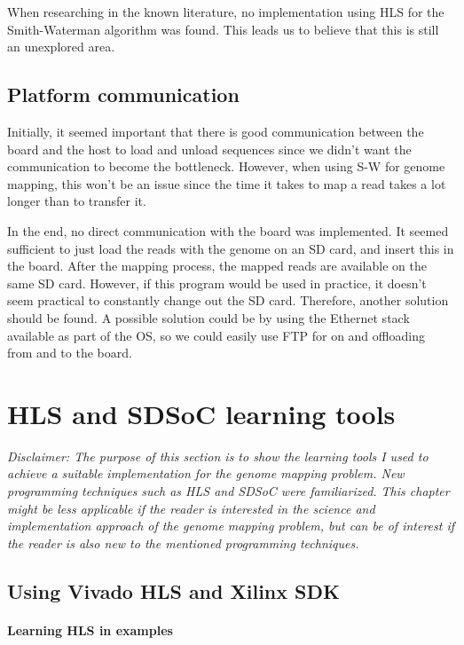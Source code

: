 When researching in the known literature, no implementation using HLS for the Smith-Waterman algorithm was found. This leads us to believe that this is still an unexplored area.

\subsection{Platform communication}

Initially, it seemed important that there is good communication between the board and the host to load and unload sequences since we didn't want the communication to become the bottleneck. However, when using S-W for genome mapping, this won't be an issue since the time it takes to map a read takes a lot longer than to transfer it.

In the end, no direct communication with the board was implemented. It seemed sufficient to just load the reads with the genome on an SD card, and insert this in the board. After the mapping process, the mapped reads are available on the same SD card. However, if this program would be used in practice, it doesn't seem practical to constantly change out the SD card. Therefore, another solution should be found. A possible solution could be by using the Ethernet stack available as part of the OS, so we could easily use FTP for on and offloading from and to the board.

\section{HLS and SDSoC learning tools}
\label{ch:InitDiff}

\textit{Disclaimer: The purpose of this section is to show the learning tools I used to achieve a suitable implementation for the genome mapping problem. New programming techniques such as HLS and SDSoC were familiarized. This chapter might be less applicable if the reader is interested in the science and implementation approach of the genome mapping problem, but can be of interest if the reader is also new to the mentioned programming techniques.}

\subsection{Using Vivado HLS and Xilinx SDK}

\paragraph{Learning HLS in examples}
\label{HLS}

